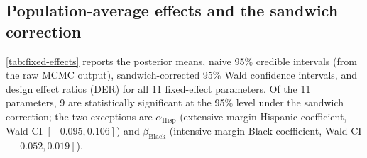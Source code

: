 
\subsection{Population-average effects and the sandwich correction}\label{sec:popavg}

\cref{tab:fixed-effects} reports the posterior means, naive 95\% credible
intervals (from the raw MCMC output), sandwich-corrected 95\% Wald confidence
intervals, and design effect ratios (DER) for all 11 fixed-effect parameters.
Of the 11 parameters, 9 are statistically significant at the 95\% level
under the sandwich correction; the two exceptions are
$\alpha_{\mathrm{Hisp}}$ (extensive-margin Hispanic coefficient, Wald CI
$[-0.095, 0.106]$) and $\beta_{\mathrm{Black}}$ (intensive-margin Black
coefficient, Wald CI $[-0.052, 0.019]$).


